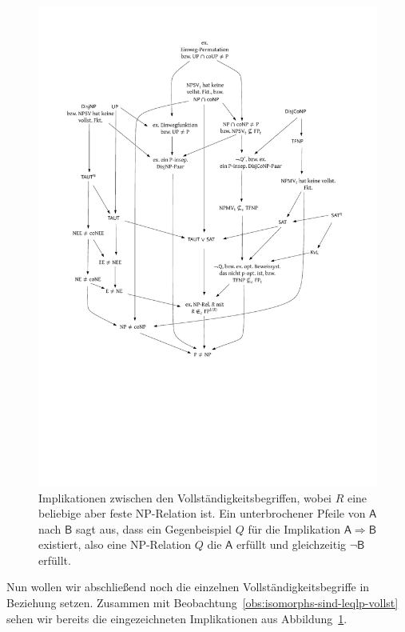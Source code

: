 \begin{figure}[tb]
    \centering\includegraphics[page=2]{figures.pdf}
    \caption{Implikationen zwischen den  Vollständigkeitsbegriffen, wobei $R$ eine beliebige aber feste NP-Relation ist. Ein unterbrochener Pfeile von $\mathsf{A}$ nach $\mathsf{B}$ sagt aus, dass ein Gegenbeispiel $Q$ für die Implikation $\mathsf{A\Rightarrow B}$ existiert, also eine NP-Relation $Q$ die $\mathsf{A}$ erfüllt und gleichzeitig $\neg\mathsf{B}$ erfüllt.}\label{fig:reduktionsbegriffe}
    \forcerectofloat
\end{figure}

Nun wollen wir abschließend noch die einzelnen Vollständigkeitsbegriffe in Beziehung setzen.
Zusammen mit Beobachtung~\ref{obs:isomorphs-sind-leqlp-vollst} sehen wir bereits die eingezeichneten Implikationen aus Abbildung~\ref{fig:reduktionsbegriffe}.

